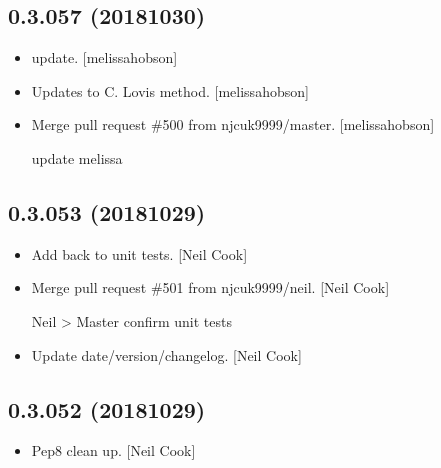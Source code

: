 \documentclass[a4paper,10pt,english]{report}
\begin{document}
\subsection{0.3.057 (2018\sphinxhyphen{}10\sphinxhyphen{}30)}
\label{\detokenize{misc/changelog:id297}}\begin{itemize}
\item {} 
 update. {[}melissa\sphinxhyphen{}hobson{]}

\item {} 
Updates to C. Lovis method. {[}melissa\sphinxhyphen{}hobson{]}

\item {} 
Merge pull request \#500 from njcuk9999/master. {[}melissa\sphinxhyphen{}hobson{]}

update melissa

\end{itemize}


\subsection{0.3.053 (2018\sphinxhyphen{}10\sphinxhyphen{}29)}
\label{\detokenize{misc/changelog:id298}}\begin{itemize}
\item {} 
Add  back to unit tests. {[}Neil Cook{]}

\item {} 
Merge pull request \#501 from njcuk9999/neil. {[}Neil Cook{]}

Neil \textendash{}\textgreater{} Master \sphinxhyphen{} confirm unit tests

\item {} 
Update date/version/changelog. {[}Neil Cook{]}

\end{itemize}


\subsection{0.3.052 (2018\sphinxhyphen{}10\sphinxhyphen{}29)}
\label{\detokenize{misc/changelog:id299}}\begin{itemize}
\item {} 
Pep8 clean up. {[}Neil Cook{]}

\end{itemize}
\end{document}
